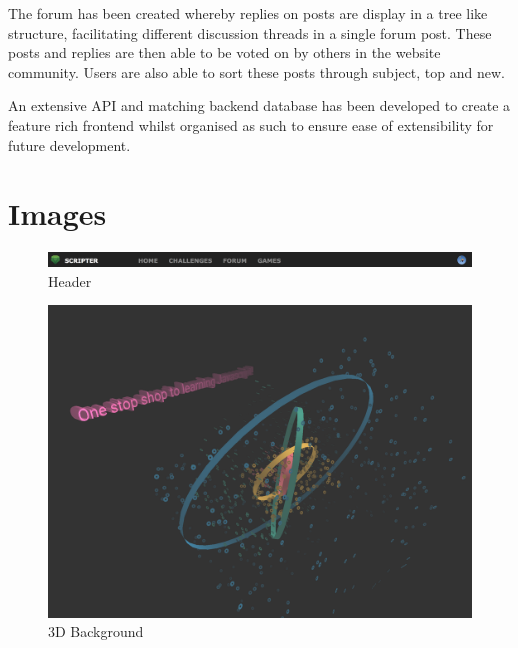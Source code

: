 \documentclass[a4paper]{article}
\begin{document}
The forum has been created whereby replies on posts are display in a tree like
structure, facilitating different discussion threads in a single forum post.
These posts and replies are then able to be voted on by others in the website
community. Users are also able to sort these posts through subject, top and new.

An extensive API and matching backend database has been developed to create a
feature rich frontend whilst organised as such to ensure ease of extensibility
for future development.

\appendix

\section{Images}

\begin{figure}[h!]
  \centering
  \includegraphics[width=1\linewidth]{images/header.png}
  \caption{Header}
  \label{fig:header}
\end{figure}

\begin{figure}[h!]
  \centering
  \includegraphics[width=0.75\linewidth]{images/3d_background.png}
  \caption{3D Background}
  \label{fig:3d_background}
\end{figure}
\end{document}
